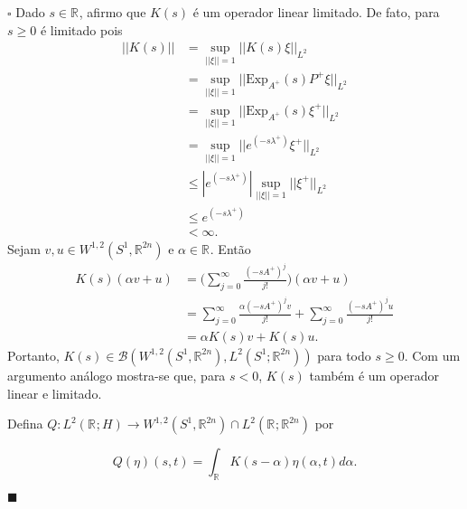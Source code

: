 \documentclass[12pt]{book}
\newenvironment{prova}[1]{$\square$ #1}{\hfill$\blacksquare$}
\newcommand{\bigparenteses}[1]{\Big( #1 \Big) }
\newcommand{\circulo}{S^{1}}
\newcommand{\espacoLdois}[1]{L^{2}(#1)}
\newcommand{\espacoLpGeral}[2]{L^{#1}(#2)}
\newcommand{\espacosobolevdois}[2]{\espacosobolevgeral{2}{#1, #2}}
\newcommand{\espacosobolevgeral}[2]{W^{1,#1}(#2)}
\newcommand{\Exp}{\text{Exp}}
\newcommand{\norma}[1]{||#1||}
\newcommand{\normaLdois}[1]{||#1||_{L^{2}}}
\newcommand{\operadoreslimitados}[2]{\mathcal{B}(#1, #2)}
\newcommand{\real}[1]{\mathbb{R}^{#1}}
\newcommand{\reta}{\real{}}
\begin{document}
\begin{prova}
		Dado $s \in \real{}$, afirmo que $K(s)$ é um operador linear limitado. De fato, para $s\geq 0$ é limitado pois
		$$
		\begin{aligned}
		\norma{K(s)} &= \sup_{\norma{\xi}=1}\normaLdois{K(s)\xi}
		\\
		&=\sup_{\norma{\xi}=1}\normaLdois{ \Exp_{A^{+}}(s)P^{+}\xi}
		\\
		&=\sup_{\norma{\xi}=1}\normaLdois{\Exp_{A^{+}}(s)\xi^{+}}
		\\
		&=\sup_{\norma{\xi}=1}\normaLdois{e^{( -s\lambda^{+})}\xi^{+}}
		\\
		&\leq |e^{( -s\lambda^{+})}|\sup_{\norma{\xi}=1}\normaLdois{\xi^{+}}
		\\
		&\leq e^{( -s\lambda^{+})}
		\\
		&< \infty.
		\end{aligned}
		$$
		Sejam $v,u\in \espacosobolevdois{\circulo}{\real{2n}} $ e $\alpha\in \reta$. Então 
		$$
		\begin{aligned}
			K(s)(\alpha v+u) &= \bigparenteses{\sum_{j=0}^{\infty}\frac{(-sA^{+})^{j}}{j!}}(\alpha v+u)
			\\
			&=\sum_{j=0}^{\infty}\frac{\alpha(-sA^{+})^{j}v}{j!}+ \sum_{j=0}^{\infty}\frac{(-sA^{+})^{j}u}{j!}
			\\
			&=\alpha K(s)v+K(s)u.
		\end{aligned}
		$$
		Portanto, $K(s) \in \operadoreslimitados{ \espacosobolevdois{\circulo}{\real{2n}} }{ \espacoLdois{\circulo;\real{2n}}}$ para todo $s\geq 0$.
		Com um argumento análogo mostra-se que, para $s<0$, $K(s)$ também é um operador linear e limitado.
		 
		Defina $Q: \espacoLdois{\real{};H} \to \espacosobolevdois{\circulo}{\real{2n}}\cap \espacoLpGeral{2}{\reta;\real{2n}}$ por
		
		
		$$
		Q(\eta)(s,t) = \int_{\real{}}K(s-\alpha)\eta(\alpha, t)d\alpha.
		$$
		

\end{prova}
\end{document}
